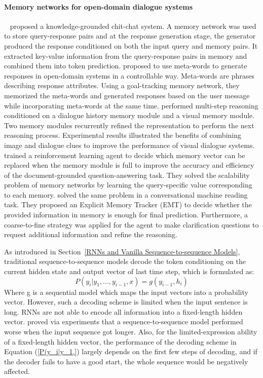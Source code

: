 \paragraph*{Memory networks for open-domain dialogue systems}~ proposed a knowledge-grounded chit-chat system. A memory network was used to store query-response pairs and at the response generation stage, the generator produced the response conditioned on both the input query and memory pairs. It extracted key-value information from the query-response pairs in memory and combined them into token prediction.  proposed to use meta-words to generate responses in open-domain systems in a controllable way. Meta-words are phrases describing response attributes. Using a goal-tracking memory network, they memorized the meta-words and generated responses based on the user message while incorporating meta-words at the same time.  performed multi-step reasoning conditioned on a dialogue history memory module and a visual memory module. Two memory modules recurrently refined the representation to perform the next reasoning process. Experimental results illustrated the benefits of combining image and dialogue clues to improve the performance of visual dialogue systems.  trained a reinforcement learning agent to decide which memory vector can be replaced when the memory module is full to improve the accuracy and efficiency of the document-grounded question-answering task. They solved the scalability problem of memory networks by learning the query-specific value corresponding to each memory.  solved the same problem in a conversational machine reading task. They proposed an Explicit Memory Tracker (EMT) to decide whether the provided information in memory is enough for final prediction. Furthermore, a coarse-to-fine strategy was applied for the agent to make clarification questions to request additional information and refine the reasoning.

\label{Attention and transformer}
As introduced in Section~\ref{RNNs and Vanilla Sequence-to-sequence Models}, traditional sequence-to-sequence models decode the token conditioning on the current hidden state and output vector of last time step, which is formulated as: 
\begin{equation}
\label{P(y_i|y_1,}
P(y_i|y_1, ..., y_{i-1}, x) = g(y_{i-1}, h_i)
\end{equation}
Where g is a sequential model which maps the input vectors into a probability vector. 
However, such a decoding scheme is limited when the input sentence is long. RNNs are not able to encode all information into a fixed-length hidden vector.  proved via experiments that a sequence-to-sequence model performed worse when the input sequence got longer. Also, for the limited-expression ability of a fixed-length hidden vector, the performance of the decoding scheme in Equation (\ref{P(y_i|y_1,}) largely depends on the first few steps of decoding, and if the decoder fails to have a good start, the whole sequence would be negatively affected.

